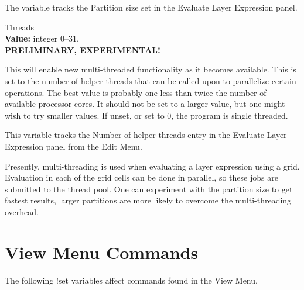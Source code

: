 \begin{description}
The variable tracks the {\cb Partition size} set in the {\cb Evaluate
Layer Expression} panel.

\item{\et Threads}\\
{\bf Value:} integer 0--31.\\
{\bf PRELIMINARY, EXPERIMENTAL!}

This will enable new multi-threaded functionality as it becomes
available.  This is set to the number of helper threads that can be
called upon to parallelize certain operations.  The best value is
probably one less than twice the number of available processor cores.  It
should not be set to a larger value, but one might wish to try smaller
values.  If unset, or set to 0, the program is single threaded.

This variable tracks the {\cb Number of helper threads} entry in the
{\cb Evaluate Layer Expression} panel from the {\cb Edit Menu}.

Presently, multi-threading is used when evaluating a layer expression
using a grid.  Evaluation in each of the grid cells can be done in
parallel, so these jobs are submitted to the thread pool.  One can
experiment with the partition size to get fastest results, larger
partitions are more likely to overcome the multi-threading overhead.
\end{description}


\section{View Menu Commands}

The following {\cb !set} variables affect commands found in the
{\cb View Menu}.

